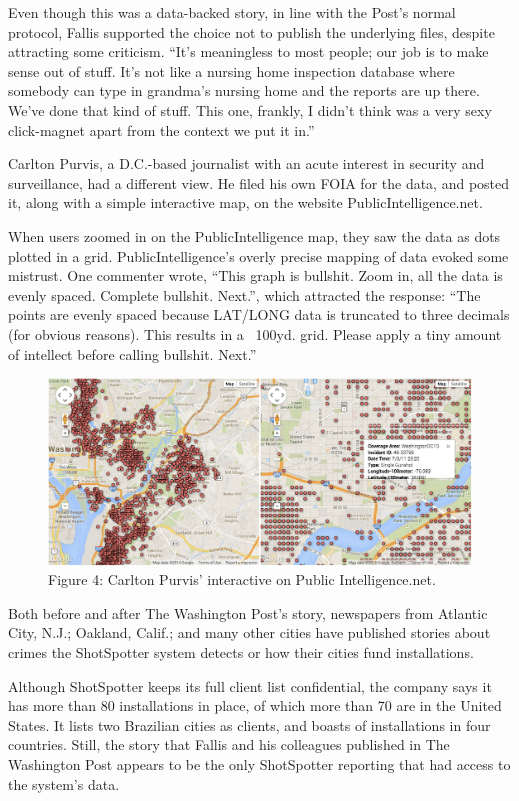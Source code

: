 Even though this was a data-backed story, in line with the Post's normal protocol,
Fallis supported the choice not to publish the underlying files, despite
attracting some criticism. ``It's meaningless to most people; our job is to
make sense out of stuff. It's not like a nursing home inspection database
where somebody can type in grandma's nursing home and the reports are
up there. We've done that kind of stuff. This one, frankly, I didn't think was
a very sexy click-magnet apart from the context we put it in.''

Carlton Purvis, a D.C.-based journalist with an acute interest in security
and surveillance, had a different view. He filed his own FOIA for the
data, and posted it, along with a simple interactive map, on the website
PublicIntelligence.net.

When users zoomed in on the PublicIntelligence map, they saw the data as
dots plotted in a grid. PublicIntelligence's overly precise mapping of data
evoked some mistrust. One commenter wrote, ``This graph is bullshit. Zoom
in, all the data is evenly spaced. Complete bullshit. Next.'', which attracted
the response: ``The points are evenly spaced because LAT/LONG data is
truncated to three decimals (for obvious reasons). This results in a ~100yd.
grid. Please apply a tiny amount of intellect before calling bullshit. Next.''

    \begin{figure}
    \includegraphics{images/PublicIntelligenceTwoZooms.png}
    \caption{Figure 4: Carlton Purvis' interactive on Public Intelligence.net.}
    \end{figure}

Both before and after The Washington Post's story, newspapers from Atlantic
City, N.J.; Oakland, Calif.; and many other cities have published stories
about crimes the ShotSpotter system detects or how their cities fund installations.

Although ShotSpotter keeps its full client list confidential, the company
says it has more than 80 installations in place, of which more than 70
are in the United States. It lists two Brazilian cities as clients, and boasts of
installations in four countries. Still, the story that Fallis and his colleagues
published in The Washington Post appears to be the only ShotSpotter reporting
that had access to the system's data.

